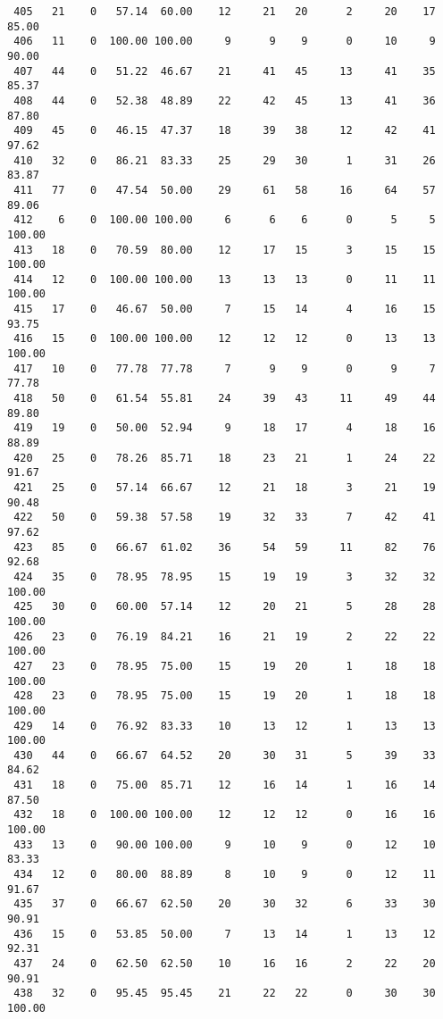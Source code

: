 \begin{verbatim}
 405   21    0   57.14  60.00    12     21   20      2     20    17    85.00
 406   11    0  100.00 100.00     9      9    9      0     10     9    90.00
 407   44    0   51.22  46.67    21     41   45     13     41    35    85.37
 408   44    0   52.38  48.89    22     42   45     13     41    36    87.80
 409   45    0   46.15  47.37    18     39   38     12     42    41    97.62
 410   32    0   86.21  83.33    25     29   30      1     31    26    83.87
 411   77    0   47.54  50.00    29     61   58     16     64    57    89.06
 412    6    0  100.00 100.00     6      6    6      0      5     5   100.00
 413   18    0   70.59  80.00    12     17   15      3     15    15   100.00
 414   12    0  100.00 100.00    13     13   13      0     11    11   100.00
 415   17    0   46.67  50.00     7     15   14      4     16    15    93.75
 416   15    0  100.00 100.00    12     12   12      0     13    13   100.00
 417   10    0   77.78  77.78     7      9    9      0      9     7    77.78
 418   50    0   61.54  55.81    24     39   43     11     49    44    89.80
 419   19    0   50.00  52.94     9     18   17      4     18    16    88.89
 420   25    0   78.26  85.71    18     23   21      1     24    22    91.67
 421   25    0   57.14  66.67    12     21   18      3     21    19    90.48
 422   50    0   59.38  57.58    19     32   33      7     42    41    97.62
 423   85    0   66.67  61.02    36     54   59     11     82    76    92.68
 424   35    0   78.95  78.95    15     19   19      3     32    32   100.00
 425   30    0   60.00  57.14    12     20   21      5     28    28   100.00
 426   23    0   76.19  84.21    16     21   19      2     22    22   100.00
 427   23    0   78.95  75.00    15     19   20      1     18    18   100.00
 428   23    0   78.95  75.00    15     19   20      1     18    18   100.00
 429   14    0   76.92  83.33    10     13   12      1     13    13   100.00
 430   44    0   66.67  64.52    20     30   31      5     39    33    84.62
 431   18    0   75.00  85.71    12     16   14      1     16    14    87.50
 432   18    0  100.00 100.00    12     12   12      0     16    16   100.00
 433   13    0   90.00 100.00     9     10    9      0     12    10    83.33
 434   12    0   80.00  88.89     8     10    9      0     12    11    91.67
 435   37    0   66.67  62.50    20     30   32      6     33    30    90.91
 436   15    0   53.85  50.00     7     13   14      1     13    12    92.31
 437   24    0   62.50  62.50    10     16   16      2     22    20    90.91
 438   32    0   95.45  95.45    21     22   22      0     30    30   100.00

\end{verbatim}
